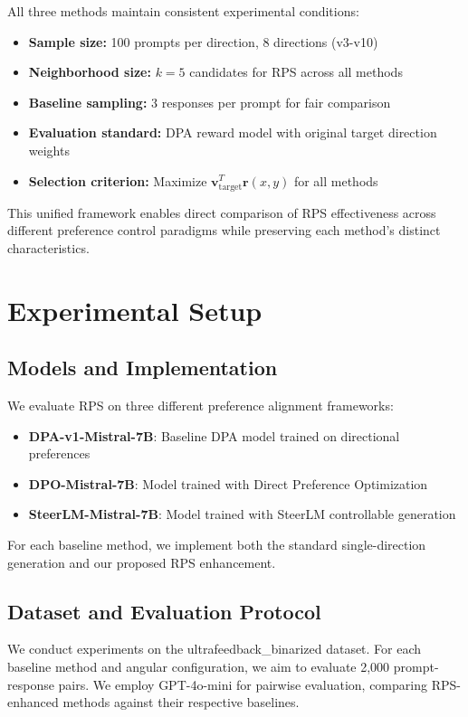 \documentclass{article} %
\begin{document}
All three methods maintain consistent experimental conditions:
\begin{itemize}
    \item \textbf{Sample size:} 100 prompts per direction, 8 directions (v3-v10)
    \item \textbf{Neighborhood size:} $k=5$ candidates for RPS across all methods
    \item \textbf{Baseline sampling:} 3 responses per prompt for fair comparison
    \item \textbf{Evaluation standard:} DPA reward model with original target direction weights
    \item \textbf{Selection criterion:} Maximize $\mathbf{v}_{\text{target}}^T \mathbf{r}(x,y)$ for all methods
\end{itemize}

This unified framework enables direct comparison of RPS effectiveness across different preference control paradigms while preserving each method's distinct characteristics.

\section{Experimental Setup}

\subsection{Models and Implementation}
We evaluate RPS on three different preference alignment frameworks:

\begin{itemize}
    \item \textbf{DPA-v1-Mistral-7B}: Baseline DPA model trained on directional preferences
    \item \textbf{DPO-Mistral-7B}: Model trained with Direct Preference Optimization  
    \item \textbf{SteerLM-Mistral-7B}: Model trained with SteerLM controllable generation
\end{itemize}

For each baseline method, we implement both the standard single-direction generation and our proposed RPS enhancement.

\subsection{Dataset and Evaluation Protocol}
We conduct experiments on the ultrafeedback\_binarized dataset. For each baseline method and angular configuration, we aim to evaluate 2,000 prompt-response pairs. We employ GPT-4o-mini for pairwise evaluation, comparing RPS-enhanced methods against their respective baselines.
\end{document}
